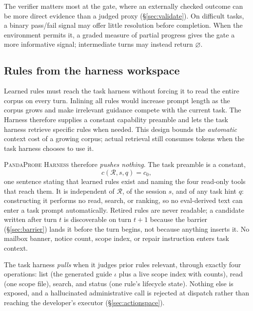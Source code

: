 \documentclass[11pt,letterpaper]{article}
\newcommand{\Rset}{\mathcal{R}}
\newcommand{\Harness}{\textsc{PandaProbe Harness}\xspace}
\newcommand{\idx}{\iota}
\begin{document}
The verifier matters most at the gate, where an externally checked outcome can be more
direct evidence than a judged proxy (\S\ref{sec:validate}). On difficult tasks, a
binary pass/fail signal may offer little resolution before completion. When the
environment permits it, a graded measure of partial progress gives the gate a
more informative signal; intermediate turns may instead return $\varnothing$.

\subsection{Rules from the harness workspace}
\label{sec:retrieval}

Learned rules must reach the task harness without forcing it to read the
entire corpus on every turn. Inlining all rules would increase prompt length as
the corpus grows and make irrelevant guidance compete with the current task.
The Harness therefore supplies a constant capability preamble and lets the
task harness retrieve specific rules when needed. This design bounds the
\emph{automatic} context cost of a growing corpus; actual retrieval still
consumes tokens when the task harness chooses to use it.

\Harness therefore \emph{pushes nothing}. The task preamble is a constant,
\begin{equation}
  c(\Rset,s,q)=c_0,
  \label{eq:context}
\end{equation}
one sentence stating that learned rules exist and naming the four read-only tools that reach them.
It is independent of $\Rset$, of the session $s$, and of any task hint $q$: constructing it performs
no read, search, or ranking, so no eval-derived text can enter a task prompt automatically.
Retired rules are never readable; a candidate written after turn $t$ is discoverable on turn $t{+}1$
because the barrier (\S\ref{sec:barrier}) lands it before the turn begins, not because anything
inserts it. No mailbox banner, notice count, scope index, or repair instruction enters task context.

The task harness \emph{pulls} when it judges prior rules relevant, through exactly four operations: list
(the generated guide $\idx$ plus a live scope index with counts), read (one scope file), search, and
status (one rule's lifecycle state). Nothing else is exposed, and a hallucinated administrative call
is rejected at dispatch rather than reaching the developer's executor (\S\ref{sec:actionspace}).
\end{document}
